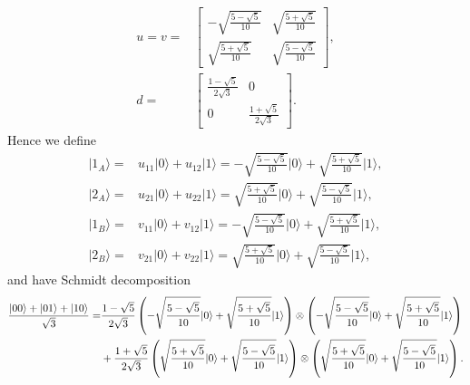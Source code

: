 \documentclass[en]{sol-man}
\begin{document}
\begin{pf}
\begin{align}
        u=v=&\left[\begin{matrix}
            -\sqrt{\frac{5-\sqrt{5}}{10}}&\sqrt{\frac{5+\sqrt{5}}{10}}\\
            \sqrt{\frac{5+\sqrt{5}}{10}}&\sqrt{\frac{5-\sqrt{5}}{10}}
        \end{matrix}\right],\\
        d=&\left[\begin{matrix}
            \frac{1-\sqrt{5}}{2\sqrt{3}}&0\\
            0&\frac{1+\sqrt{5}}{2\sqrt{3}}
        \end{matrix}\right].
    \end{align}
    Hence we define
    \begin{align}
        \lvert 1_A\rangle=&u_{11}\lvert 0\rangle+u_{12}\lvert 1\rangle=-\sqrt{\frac{5-\sqrt{5}}{10}}\lvert 0\rangle+\sqrt{\frac{5+\sqrt{5}}{10}}\lvert 1\rangle,\\
        \lvert 2_A\rangle=&u_{21}\lvert 0\rangle+u_{22}\lvert 1\rangle=\sqrt{\frac{5+\sqrt{5}}{10}}\lvert 0\rangle+\sqrt{\frac{5-\sqrt{5}}{10}}\lvert 1\rangle,\\
        \lvert 1_B\rangle=&v_{11}\lvert 0\rangle+v_{12}\lvert 1\rangle=-\sqrt{\frac{5-\sqrt{5}}{10}}\lvert 0\rangle+\sqrt{\frac{5+\sqrt{5}}{10}}\lvert 1\rangle,\\
        \lvert 2_B\rangle=&v_{21}\lvert 0\rangle+v_{22}\lvert 1\rangle=\sqrt{\frac{5+\sqrt{5}}{10}}\lvert 0\rangle+\sqrt{\frac{5-\sqrt{5}}{10}}\lvert 1\rangle,
    \end{align}
    and have Schmidt decomposition
    \begin{align}
        \notag\frac{\lvert 00\rangle+\lvert 01\rangle+\lvert 10\rangle}{\sqrt{3}}=&\frac{1-\sqrt{5}}{2\sqrt{3}}\left(-\sqrt{\frac{5-\sqrt{5}}{10}}\lvert 0\rangle+\sqrt{\frac{5+\sqrt{5}}{10}}\lvert 1\rangle\right)\otimes\left(-\sqrt{\frac{5-\sqrt{5}}{10}}\lvert 0\rangle+\sqrt{\frac{5+\sqrt{5}}{10}}\lvert 1\rangle\right)\\
        &+\frac{1+\sqrt{5}}{2\sqrt{3}}\left(\sqrt{\frac{5+\sqrt{5}}{10}}\lvert 0\rangle+\sqrt{\frac{5-\sqrt{5}}{10}}\lvert 1\rangle\right)\otimes\left(\sqrt{\frac{5+\sqrt{5}}{10}}\lvert 0\rangle+\sqrt{\frac{5-\sqrt{5}}{10}}\lvert 1\rangle\right).
    \end{align}
\end{pf}
\end{document}
